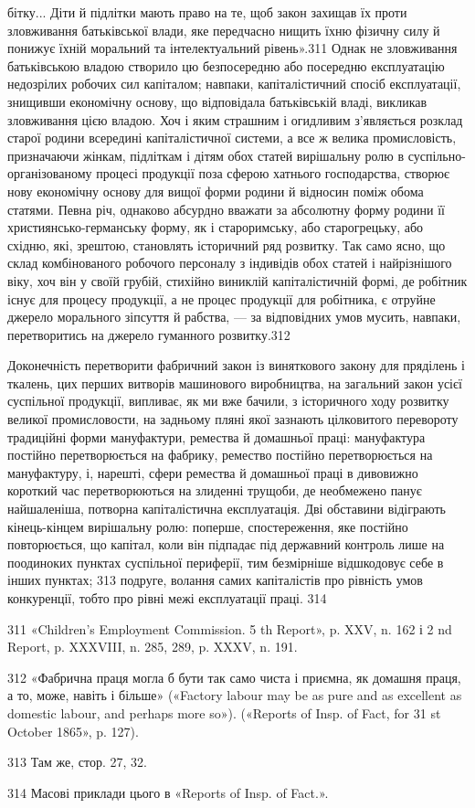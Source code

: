 бітку... Діти й підлітки мають право на те, щоб закон захищав їх
проти зловживання батьківської влади, яке передчасно нищить
їхню фізичну силу й понижує їхній моральний та інтелектуальний
рівень».311 Однак не зловживання батьківською владою
створило цю безпосередню або посередню експлуатацію недозрілих
робочих сил капіталом; навпаки, капіталістичний спосіб
експлуатації, знищивши економічну основу, що відповідала батьківській
владі, викликав зловживання цією владою. Хоч і яким
страшним і огидливим з’являється розклад старої родини всередині
капіталістичної системи, а все ж велика промисловість,
призначаючи жінкам, підліткам і дітям обох статей вирішальну
ролю в суспільно-організованому процесі продукції поза сферою
хатнього господарства, створює нову економічну основу для
вищої форми родини й відносин поміж обома статями. Певна
річ, однаково абсурдно вважати за абсолютну форму родини її
християнсько-германську форму, як і староримську, або старогрецьку,
або східню, які, зрештою, становлять історичний ряд
розвитку. Так само ясно, що склад комбінованого робочого персоналу
з індивідів обох статей і найрізнішого віку, хоч він у своїй
грубій, стихійно виниклій капіталістичній формі, де робітник
існує для процесу продукції, а не процес продукції для робітника,
є отруйне джерело морального зіпсуття й рабства, — за відповідних
умов мусить, навпаки, перетворитись на джерело гуманного
розвитку.312

Доконечність перетворити фабричний закон із виняткового
закону для пряділень і ткалень, цих перших витворів машинового
виробництва, на загальний закон усієї суспільної продукції, випливає,
як ми вже бачили, з історичного ходу розвитку великої промисловости,
на задньому пляні якої зазнають цілковитого перевороту
традиційні форми мануфактури, ремества й домашньої
праці: мануфактура постійно перетворюється на фабрику, ремество
постійно перетворюється на мануфактуру, і, нарешті,
сфери ремества й домашньої праці в дивовижно короткий час
перетворюються на злиденні трущоби, де необмежено панує найшаленіша,
потворна капіталістична експлуатація. Дві обставини
відіграють кінець-кінцем вирішальну ролю: поперше, спостереження,
яке постійно повторюється, що капітал, коли він підпадає
під державний контроль лише на поодиноких пунктах
суспільної периферії, тим безмірніше відшкодовує себе в інших
пунктах; 313 подруге, волання самих капіталістів про рівність
умов конкуренції, тобто про рівні межі експлуатації праці. 314

311 «Children’s Employment Commission. 5 th Report», p. XXV,
n. 162 і 2 nd Report, p. XXXVIII, n. 285, 289, p. XXXV, n. 191.

312 «Фабрична праця могла б бути так само чиста і приємна, як домашня
праця, а то, може, навіть і більше» («Factory labour may be as
pure and as excellent as domestic labour, and perhaps more so»). («Reports
of Insp. of Fact, for 31 st October 1865», p. 127).

313 Там же, стор. 27, 32.

314 Масові приклади цього в «Reports of Insp. of Fact.».
